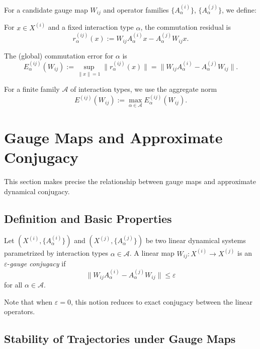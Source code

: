 \documentclass[11pt]{article}
\begin{document}
For a candidate gauge map $W_{ij}$ and operator families $\{A^{(i)}_\alpha\}$, $\{A^{(j)}_\alpha\}$, we define:

\begin{definition}
For $x \in X^{(i)}$ and a fixed interaction type $\alpha$, the commutation residual is
\[
  r^{(ij)}_\alpha(x) := W_{ij} A^{(i)}_\alpha x - A^{(j)}_\alpha W_{ij} x.
\]
\end{definition}

\begin{definition}
The (global) commutation error for $\alpha$ is
\[
  E^{(ij)}_\alpha(W_{ij}) := \sup_{\|x\|=1} \|r^{(ij)}_\alpha(x)\| = \| W_{ij} A^{(i)}_\alpha - A^{(j)}_\alpha W_{ij} \|.
\]
\end{definition}

For a finite family $\mathcal{A}$ of interaction types, we use the aggregate norm
\[
  E^{(ij)}(W_{ij}) := \max_{\alpha \in \mathcal{A}} E^{(ij)}_\alpha(W_{ij}).
\]

\section{Gauge Maps and Approximate Conjugacy}

This section makes precise the relationship between gauge maps and approximate dynamical conjugacy.

\subsection{Definition and Basic Properties}

\begin{definition}
Let $(X^{(i)}, \{A^{(i)}_\alpha\})$ and $(X^{(j)}, \{A^{(j)}_\alpha\})$ be two linear dynamical systems parametrized by interaction types $\alpha \in \mathcal{A}$. A linear map $W_{ij}: X^{(i)} \to X^{(j)}$ is an $\varepsilon$-\emph{gauge conjugacy} if
\[
  \| W_{ij} A^{(i)}_\alpha - A^{(j)}_\alpha W_{ij} \| \leq \varepsilon
\]
for all $\alpha \in \mathcal{A}$.
\end{definition}

Note that when $\varepsilon = 0$, this notion reduces to exact conjugacy between the linear operators.

\subsection{Stability of Trajectories under Gauge Maps}
\end{document}
